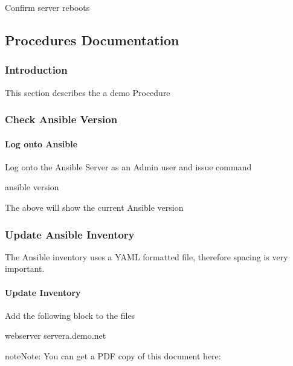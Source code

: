 \documentclass[letterpaper,10pt,english]{sphinxmanual}
\begin{document}
\sphinxAtStartPar
{} Confirm server reboots


\subsection{Procedures Documentation}
\label{\detokenize{procedures:procedures-documentation}}\label{\detokenize{procedures::doc}}

\subsubsection{Introduction}
\label{\detokenize{procedures:introduction}}
\sphinxAtStartPar
This section describes the a demo Procedure


\subsubsection{Check Ansible Version}
\label{\detokenize{procedures:check-ansible-version}}

\paragraph{Log onto Ansible}
\label{\detokenize{procedures:log-onto-ansible}}
\sphinxAtStartPar
Log onto the Ansible Server as an Admin user and issue command

\begin{sphinxVerbatim}[commandchars=\\\{\}]
ansible \PYGZhy{}\PYGZhy{}version
\end{sphinxVerbatim}

\sphinxAtStartPar
The above will show the current Ansible version


\subsubsection{Update Ansible Inventory}
\label{\detokenize{procedures:update-ansible-inventory}}
\sphinxAtStartPar
The Ansible inventory uses a YAML formatted file, therefore spacing is very important.


\paragraph{Update Inventory}
\label{\detokenize{procedures:update-inventory}}
\sphinxAtStartPar
Add the following block to the  files

\begin{sphinxVerbatim}[commandchars=\\\{\}]
\PYG{o}{[}webserver\PYG{o}{]}
servera.demo.net
\end{sphinxVerbatim}

\begin{sphinxadmonition}{note}{Note:}
\sphinxAtStartPar
You can get a PDF copy of this document here: 
\end{sphinxadmonition}



\renewcommand{\indexname}{Index}
\printindex
\end{document}

